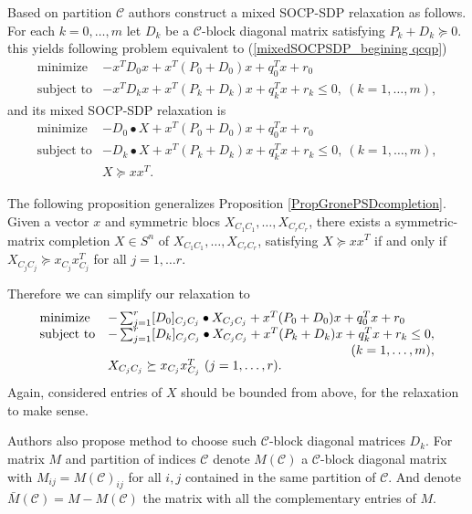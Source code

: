 \documentclass[12pt]{book}
\theoremstyle{definition}
\begin{document}
Based on partition $\mathcal{C}$ authors construct a mixed SOCP-SDP relaxation as follows. For each $k=0,\dots ,m$ let $D_k$ be a $\mathcal{C}$-block diagonal matrix satisfying $P_k + D_k \succeq 0.$
this yields following problem equivalent to (\ref{mixedSOCPSDP_begining qcqp})
\begin{equation}
\begin{array}{ll}
\mbox{minimize}& - x^TD_0x + x^T(P_0+D_0)x + q_0^Tx + r_0 \\
\mbox{subject to}& - x^TD_kx + x^T(P_k+D_k)x + q_k^Tx + r_k \leq 0, \  (k = 1,\dots ,m),
\end{array} 
\end{equation}
and its mixed SOCP-SDP relaxation is 
\begin{equation}
\begin{array}{ll}
\mbox{minimize}& - D_0\bullet X + x^T(P_0+D_0)x + q_0^Tx + r_0 \\
\mbox{subject to}& - D_k\bullet X + x^T(P_k+D_k)x  + q_k^Tx + r_k \leq 0, \  (k = 1,\dots ,m), \\
& X\succeq xx^T.
\end{array} 
\end{equation}

The following proposition generalizes Proposition \ref{PropGronePSDcompletion}.
\prop [{[\ref{GronePSDcompletions}]}]
\label{PropGronePSDcompletion2} Given a vector $x$ and symmetric blocs $X_{C_1C_1},\dots ,X_{C_rC_r}$, there exists
a symmetric-matrix completion $X\in S^n$ of $X_{C_1C_1},\dots ,X_{C_rC_r}$, satisfying $X \succeq xx^T$ if and only if $X_{C_jC_j} \succeq x_{C_j}x_{C_j}^T$ for all $j = 1,\dots r.$ \rm 

Therefore we can simplify our relaxation to 
\begin{equation}
\label{InBetweenCBlockRelax}
\begin{array}{ll}
\mbox{minimize}& - \sum_{j=1}^r [D_0]_{C_jC_j}\bullet X_{C_jC_j} + x^T(P_0+D_0)x + q_0^Tx + r_0 \\
\mbox{subject to}& - \sum_{j=1}^r [D_k]_{C_jC_j}\bullet X_{C_jC_j}+ x^T(P_k+D_k)x  + q_k^Tx + r_k \leq 0,\\  & \hfill (k = 1,\dots ,m), \\
& X_{C_jC_j}\succeq x_{C_j}x_{C_j}^T \ (j=1,\dots ,r).
\end{array} 
\end{equation}
Again, considered entries of $X$ should be bounded from above, for the relaxation to make sense.

Authors also propose method to choose such $\mathcal{C}$-block diagonal matrices $D_k$.  For matrix $M$ and partition of indices $\mathcal{C}$ denote $M(\mathcal{C})$ a $\mathcal{C}$-block diagonal matrix with $M_{ij} = M(\mathcal{C})_{ij}$ for all $i,j$ contained in the same partition of $\mathcal{C}$. And denote $\bar{M}(\mathcal{C}) = M-M(\mathcal{C})$ the matrix with all the complementary entries of $M$.
\end{document}
